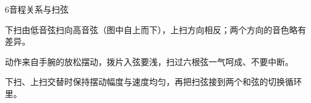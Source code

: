 \begin{lessoncard}{6}{音程关系与扫弦}
\begin{fignote}
\begin{center}
\end{center}
\begin{fignotes}
\item 下扫由低音弦扫向高音弦（图中自上而下），上扫方向相反；两个方向的音色略有差异。
\item 动作来自手腕的放松摆动，拨片入弦要浅，扫过六根弦一气呵成、不要中断。
\item 下扫、上扫交替时保持摆动幅度与速度均匀，再把扫弦接到两个和弦的切换循环里。
\end{fignotes}
\end{fignote}
\end{lessoncard}

